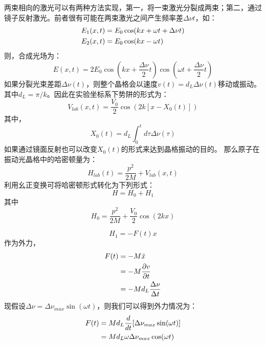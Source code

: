 \documentclass{article}
\begin{document}
	\clearpage
	两束相向的激光可以有两种方法实现，第一，将一束激光分裂成两束；第二，通过镜子反射激光。前者很有可能在两束激光之间产生频率差$\Delta \nu t$，如：
	\begin{align}
		E_1(x,t) &= E_0 \cos(kx + \omega t + \Delta \nu t) \notag \\
		E_2(x,t) &= E_0 \cos(kx - \omega t) 
	\end{align}
	则，合成光场为：
	\begin{equation}
		E(x,t) = 2E_0 \cos(kx + \frac{\Delta \nu}{2}t) \cos(\omega t + \frac{\Delta \nu}{2}t)
	\end{equation}
	如果分裂光束差距$\Delta \nu(t)$，则整个晶格会以速度$v(t) = d_L\Delta \nu(t) $移动或振动。其中$d_L = \pi / k$。因此在实验坐标系下势阱的形式为：
	\begin{equation}
		V_{lab}(x,t) = \frac{V_0}{2} \cos(2k[x-X_0(t)])
	\end{equation}
	其中，
	\begin{equation}
		X_0(t) = d_L \int_0^t d \tau \Delta \nu(\tau)
	\end{equation}
	如果通过镜面反射也可以改变$X_0(t)$的形式来达到晶格振动的目的。
	那么原子在振动光晶格中的哈密顿量为：
	\begin{equation}
		H_{lab}(t) = \frac{p^2}{2M} + V_{lab}(x,t)
	\end{equation}
	利用幺正变换可将哈密顿形式转化为下列形式：
	\begin{equation}
		H = H_0 + H_1
	\end{equation}
	其中
	\begin{equation}
		H_0 = \frac{p^2}{2M} + \frac{V_0}{2}\cos(2kx)
	\end{equation}

	\begin{equation}
		H_1 = -F(t)x 
	\end{equation}
	作为外力，
	\begin{align}
		F(t) &= -M \ddot x \notag \\
			 &= -M \frac{\partial v}{\partial t} \notag \\
			 &= -M d_L \frac{\Delta \nu}{\Delta t}
	\end{align}
	现假设$\Delta \nu = \Delta \nu_{max} \sin(\omega t)$，则我们可以得到外力情况为：
	\begin{align}
		F(t) &= M d_L \frac{d}{dt}[\Delta \nu_{max} \sin(\omega t)] \notag \\
			 &= M d_L \omega \Delta \nu_{max} \cos(\omega t)
	\end{align}
\end{document}

